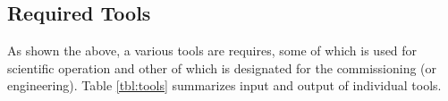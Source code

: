 \subsection{Required Tools}\label{sec:required_tools}
As shown the above, a various tools are requires, some of which is used for scientific operation and other of which is designated for the commissioning (or engineering).
Table \ref{tbl:tools} summarizes input and output of individual tools.



